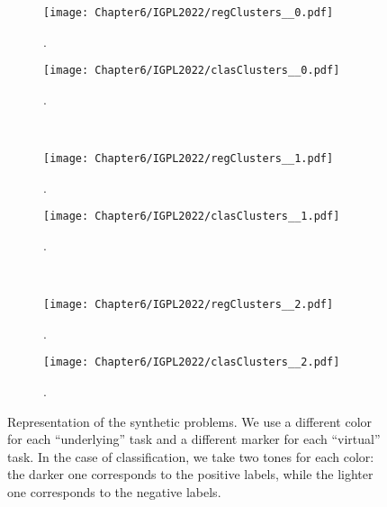 

\begin{figure}[t!]
    \centering
    \begin{subfigure}[b]{0.49\textwidth}
        \centering
        \texttt{[image: Chapter6/IGPL2022/regClusters\_\_0.pdf]}
        \caption{.}
        \label{regClusters0}
    \end{subfigure}
    \hfill
    \begin{subfigure}[b]{0.49\textwidth}
        \centering
        \texttt{[image: Chapter6/IGPL2022/clasClusters\_\_0.pdf]}
        \caption{.}
        \label{clasClusters0}
    \end{subfigure}
    \\
    \begin{subfigure}[b]{0.49\textwidth}
        \centering
        \texttt{[image: Chapter6/IGPL2022/regClusters\_\_1.pdf]}
        \caption{.}
        \label{regClusters1}
    \end{subfigure}
    \hfill
    \begin{subfigure}[b]{0.49\textwidth}
        \centering
        \texttt{[image: Chapter6/IGPL2022/clasClusters\_\_1.pdf]}
        \caption{.}
        \label{clasClusters1}
    \end{subfigure}
    \\
    \begin{subfigure}[b]{0.49\textwidth}
        \centering
        \texttt{[image: Chapter6/IGPL2022/regClusters\_\_2.pdf]}
        \caption{.}
        \label{regClusters2}
    \end{subfigure}
    \hfill
    \begin{subfigure}[b]{0.49\textwidth}
        \centering
        \texttt{[image: Chapter6/IGPL2022/clasClusters\_\_2.pdf]}
        \caption{.}
        \label{clasClusters2}
    \end{subfigure}
    \caption{Representation of the synthetic problems. We use a different color for each ``underlying'' task and a different marker for each ``virtual'' task. In the case of classification, we take two tones for each color: the darker one corresponds to the positive labels, while the lighter one corresponds to the negative labels.}
\end{figure}


